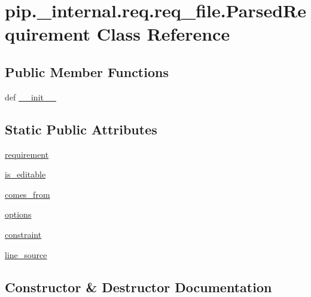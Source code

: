 \hypertarget{classpip_1_1__internal_1_1req_1_1req__file_1_1ParsedRequirement}{}\section{pip.\+\_\+internal.\+req.\+req\+\_\+file.\+Parsed\+Requirement Class Reference}
\label{classpip_1_1__internal_1_1req_1_1req__file_1_1ParsedRequirement}
\subsection*{Public Member Functions}
\begin{DoxyCompactItemize}
\item 
def \hyperlink{classpip_1_1__internal_1_1req_1_1req__file_1_1ParsedRequirement_a5d5a723c707be3e1cf7863c4b2dcf280}{\+\_\+\+\_\+init\+\_\+\+\_\+}
\end{DoxyCompactItemize}
\subsection*{Static Public Attributes}
\begin{DoxyCompactItemize}
\item 
\hyperlink{classpip_1_1__internal_1_1req_1_1req__file_1_1ParsedRequirement_ae020aca19e8a4ee623913855998296c2}{requirement}
\item 
\hyperlink{classpip_1_1__internal_1_1req_1_1req__file_1_1ParsedRequirement_ae3b7a77c60a558641987e94f11a37623}{is\+\_\+editable}
\item 
\hyperlink{classpip_1_1__internal_1_1req_1_1req__file_1_1ParsedRequirement_a7f8d93e84a2fb3f63fac1cc45f50fc0d}{comes\+\_\+from}
\item 
\hyperlink{classpip_1_1__internal_1_1req_1_1req__file_1_1ParsedRequirement_a8027f47d3d6b31c719e49132ab502879}{options}
\item 
\hyperlink{classpip_1_1__internal_1_1req_1_1req__file_1_1ParsedRequirement_a78633803d1aaa9e0eacda9ebbe28850f}{constraint}
\item 
\hyperlink{classpip_1_1__internal_1_1req_1_1req__file_1_1ParsedRequirement_a0f88a904ce34cbaca03a55931e482764}{line\+\_\+source}
\end{DoxyCompactItemize}


\subsection{Constructor \& Destructor Documentation}
\mbox{\label{classpip_1_1__internal_1_1req_1_1req__file_1_1ParsedRequirement_a5d5a723c707be3e1cf7863c4b2dcf280}} 
